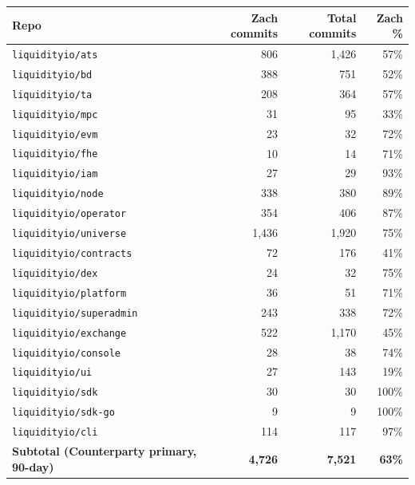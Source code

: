 \documentclass[11pt,letterpaper]{article}
\begin{document}
\begin{center}
\begin{small}
\begin{tabular}{lrrr}
\toprule
\textbf{Repo} & \textbf{Zach commits} & \textbf{Total commits} & \textbf{Zach \%} \\
\midrule
\texttt{liquidityio/ats}        & 806    & 1{,}426 & 57\% \\
\texttt{liquidityio/bd}         & 388    & 751     & 52\% \\
\texttt{liquidityio/ta}         & 208    & 364     & 57\% \\
\texttt{liquidityio/mpc}        & 31     & 95      & 33\% \\
\texttt{liquidityio/evm}        & 23     & 32      & 72\% \\
\texttt{liquidityio/fhe}        & 10     & 14      & 71\% \\
\texttt{liquidityio/iam}        & 27     & 29      & 93\% \\
\texttt{liquidityio/node}       & 338    & 380     & 89\% \\
\texttt{liquidityio/operator}   & 354    & 406     & 87\% \\
\texttt{liquidityio/universe}   & 1{,}436 & 1{,}920 & 75\% \\
\texttt{liquidityio/contracts}  & 72     & 176     & 41\% \\
\texttt{liquidityio/dex}        & 24     & 32      & 75\% \\
\texttt{liquidityio/platform}   & 36     & 51      & 71\% \\
\texttt{liquidityio/superadmin} & 243    & 338     & 72\% \\
\texttt{liquidityio/exchange}   & 522    & 1{,}170 & 45\% \\
\texttt{liquidityio/console}    & 28     & 38      & 74\% \\
\texttt{liquidityio/ui}         & 27     & 143     & 19\% \\
\texttt{liquidityio/sdk}        & 30     & 30      & 100\% \\
\texttt{liquidityio/sdk-go}     & 9      & 9       & 100\% \\
\texttt{liquidityio/cli}        & 114    & 117     & 97\% \\
\midrule
\textbf{Subtotal (Counterparty primary, 90-day)} & \textbf{4{,}726} & \textbf{7{,}521} & \textbf{63\%} \\
\bottomrule
\end{tabular}
\end{small}
\end{center}
\end{document}
